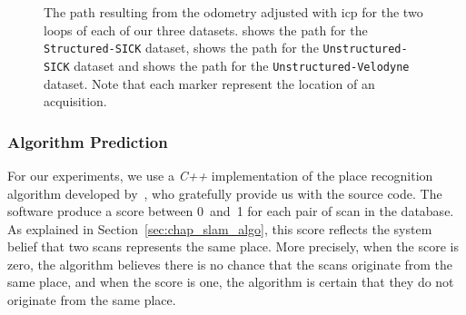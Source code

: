 \begin{figure}
    \centering
    \caption[Path adjusted using \gls*{icp} for our three datasets.]{The path resulting from the odometry adjusted with \gls*{icp} for the two loops of each of our three datasets. \protect{} shows the path for the \texttt{Structured-SICK} dataset, \protect{} shows the path for the \texttt{Unstructured-SICK} dataset and \protect{} shows the path for the \texttt{Unstructured-Velodyne} dataset. Note that each marker represent the location of an acquisition.}
    \label{fig:chap_slam_results_paths}
\end{figure}


\subsubsection{Algorithm Prediction}
For our experiments, we use a \textit{C++} implementation of the place recognition algorithm developed by~\citet{Steder2011b}, who gratefully provide us with the source code. The software produce a score between 0~and~1 for each pair of scan in the database. As explained in Section~\ref{sec:chap_slam_algo}, this score reflects the system belief that two scans represents the same place. More precisely, when the score is zero, the algorithm believes there is no chance that the scans originate from the same place, and when the score is one, the algorithm is certain that they do not originate from the same place.

